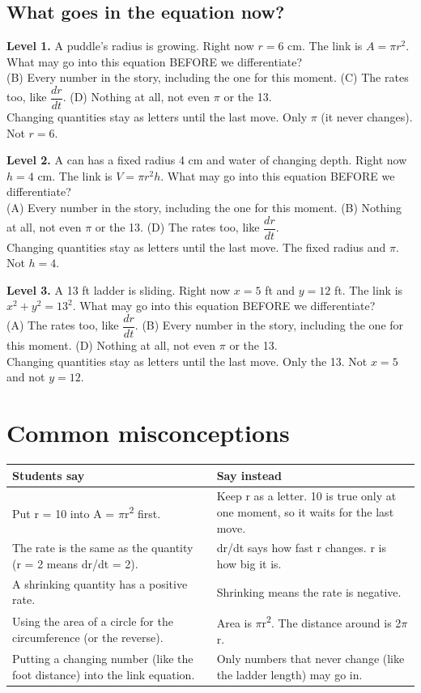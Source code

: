 \documentclass[11pt]{article}
\begin{document}
\subsection*{What goes in the equation now?}
\noindent\textbf{Level 1.} A puddle's radius is growing. Right now $r=6$ cm. The link is $A=\pi r^2$. What may go into this equation BEFORE we differentiate?\\  \quad (B) Every number in the story, including the one for this moment. \quad (C) The rates too, like $\dfrac{dr}{dt}$. \quad (D) Nothing at all, not even $\pi$ or the 13.\\  \quad Changing quantities stay as letters until the last move. Only $\pi$ (it never changes). Not $r=6$.\par\medskip
\noindent\textbf{Level 2.} A can has a fixed radius 4 cm and water of changing depth. Right now $h=4$ cm. The link is $V=\pi r^2h$. What may go into this equation BEFORE we differentiate?\\ (A) Every number in the story, including the one for this moment. \quad (B) Nothing at all, not even $\pi$ or the 13. \quad {} \quad (D) The rates too, like $\dfrac{dr}{dt}$.\\  \quad Changing quantities stay as letters until the last move. The fixed radius and $\pi$. Not $h=4$.\par\medskip
\noindent\textbf{Level 3.} A 13 ft ladder is sliding. Right now $x=5$ ft and $y=12$ ft. The link is $x^2+y^2=13^2$. What may go into this equation BEFORE we differentiate?\\ (A) The rates too, like $\dfrac{dr}{dt}$. \quad (B) Every number in the story, including the one for this moment. \quad {} \quad (D) Nothing at all, not even $\pi$ or the 13.\\  \quad Changing quantities stay as letters until the last move. Only the 13. Not $x=5$ and not $y=12$.\par\medskip
\section*{Common misconceptions}\begin{tabularx}{\textwidth}{@{}X X@{}}\toprule Students say & Say instead\\\midrule
Put r = 10 into A = $\pi$r\textsuperscript{2} first. & Keep r as a letter. 10 is true only at one moment, so it waits for the last move.\\
The rate is the same as the quantity (r = 2 means dr/dt = 2). & dr/dt says how fast r changes. r is how big it is.\\
A shrinking quantity has a positive rate. & Shrinking means the rate is negative.\\
Using the area of a circle for the circumference (or the reverse). & Area is $\pi$r\textsuperscript{2}. The distance around is 2$\pi$r.\\
Putting a changing number (like the foot distance) into the link equation. & Only numbers that never change (like the ladder length) may go in.\\
\bottomrule\end{tabularx}
\end{document}
